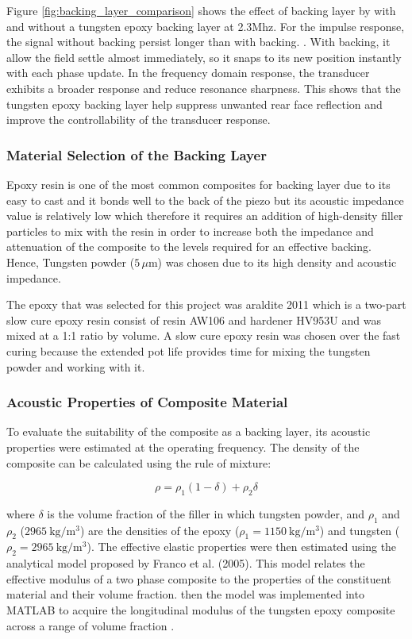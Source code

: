 \documentclass[11pt,a4paper]{article}
\begin{document}
\noindent Figure \ref{fig:backing_layer_comparison} shows the effect of backing layer by with and without a tungsten epoxy backing layer at 2.3Mhz. For the impulse response, the signal without backing persist longer than with backing. . With backing, it allow the field settle almost immediately, so it snaps to its new position instantly with each phase update. In the frequency domain response, the transducer exhibits a broader response and reduce resonance sharpness. This shows that the tungsten epoxy backing layer help suppress unwanted rear face reflection and improve the controllability of the transducer response.


\subsubsection {Material Selection of the Backing Layer}

Epoxy resin is one of the most common composites for backing layer due to its easy to cast and it bonds well to the back of the piezo but its acoustic impedance value is relatively low which therefore it requires an addition of high-density filler particles to mix with the resin in order to increase both the impedance and attenuation of the composite to the levels required for an effective backing. Hence, Tungsten powder ($5\,\mu\mathrm{m}$) was chosen due to its high density and acoustic impedance\cite{franco2005determination}. 

The epoxy that was selected for this project was araldite 2011 which is a two-part slow cure epoxy resin consist of resin AW106 and hardener HV953U and was mixed at a 1:1 ratio by volume. A slow cure epoxy resin was chosen over the fast curing because the extended pot life provides time for mixing the tungsten powder and working with it.

\subsubsection {Acoustic Properties of Composite Material}
To evaluate the suitability of the composite as a backing layer, its  acoustic properties were estimated at the operating frequency. The density of the composite can be calculated using the rule of mixture:

\begin{equation}
\rho = \rho_1(1-\delta) + \rho_2\delta
\end{equation}

\noindent where $\delta$ is the volume fraction of the filler in which tungsten powder, and $\rho_1$ and $\rho_2$  ($2965\ \mathrm{kg/m^3}$) are the densities of the epoxy ($\rho_1 = 1150\ \mathrm{kg/m^3}$) and tungsten ($\rho_2 = 2965\ \mathrm{kg/m^3}$).
The effective elastic properties were then estimated using the analytical model proposed by Franco et al. (2005)\cite{franco2005determination}. This model relates the effective modulus of a two phase composite to the properties of the constituent material and their volume fraction. then the model was implemented into MATLAB to acquire the longitudinal modulus of the tungsten epoxy composite across a range of volume fraction \cite{sayers1984ultrasonic,franco2005determination}.
\end{document}
